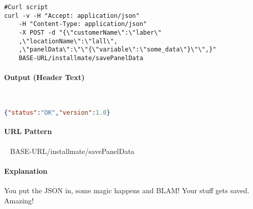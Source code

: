 \documentclass[
10pt, %
letterpaper, %
oneside, %
headinclude,footinclude, %
BCOR5mm, %
]{scrartcl}
\begin{document}
\begin{lstlisting}
#Curl script
curl -v -H "Accept: application/json" 
	-H "Content-Type: application/json" 
	-X POST -d "{\"customerName\":\"laber\"
	,\"locationName\":\"lall\",
	,\"panelData\":\"\"{\"variable\":\"some_data\"}\"\",}" 
	BASE-URL/installmate/savePanelData
\end{lstlisting}

\paragraph{Output (Header Text)}~
\begin{lstlisting}[language=json]
{"status":"OK","version":1.0}
\end{lstlisting}

\paragraph{URL Pattern} 
~\newline
BASE-URL/installmate/savePanelData

\paragraph{Explanation} You put the JSON in, some magic happens and BLAM! Your stuff gets saved. Amazing!
\end{document}
